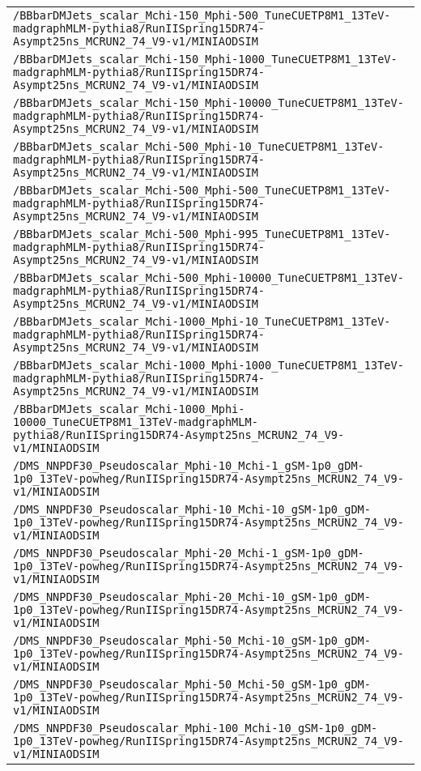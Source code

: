 \begin{center}
\begin{tabular}{l}
\verb!/BBbarDMJets_scalar_Mchi-150_Mphi-500_TuneCUETP8M1_13TeV-madgraphMLM-pythia8/RunIISpring15DR74-Asympt25ns_MCRUN2_74_V9-v1/MINIAODSIM! \tabularnewline
\verb!/BBbarDMJets_scalar_Mchi-150_Mphi-1000_TuneCUETP8M1_13TeV-madgraphMLM-pythia8/RunIISpring15DR74-Asympt25ns_MCRUN2_74_V9-v1/MINIAODSIM! \tabularnewline
\verb!/BBbarDMJets_scalar_Mchi-150_Mphi-10000_TuneCUETP8M1_13TeV-madgraphMLM-pythia8/RunIISpring15DR74-Asympt25ns_MCRUN2_74_V9-v1/MINIAODSIM! \tabularnewline
\verb!/BBbarDMJets_scalar_Mchi-500_Mphi-10_TuneCUETP8M1_13TeV-madgraphMLM-pythia8/RunIISpring15DR74-Asympt25ns_MCRUN2_74_V9-v1/MINIAODSIM! \tabularnewline
\verb!/BBbarDMJets_scalar_Mchi-500_Mphi-500_TuneCUETP8M1_13TeV-madgraphMLM-pythia8/RunIISpring15DR74-Asympt25ns_MCRUN2_74_V9-v1/MINIAODSIM! \tabularnewline
\verb!/BBbarDMJets_scalar_Mchi-500_Mphi-995_TuneCUETP8M1_13TeV-madgraphMLM-pythia8/RunIISpring15DR74-Asympt25ns_MCRUN2_74_V9-v1/MINIAODSIM! \tabularnewline
\verb!/BBbarDMJets_scalar_Mchi-500_Mphi-10000_TuneCUETP8M1_13TeV-madgraphMLM-pythia8/RunIISpring15DR74-Asympt25ns_MCRUN2_74_V9-v1/MINIAODSIM! \tabularnewline
\verb!/BBbarDMJets_scalar_Mchi-1000_Mphi-10_TuneCUETP8M1_13TeV-madgraphMLM-pythia8/RunIISpring15DR74-Asympt25ns_MCRUN2_74_V9-v1/MINIAODSIM! \tabularnewline
\verb!/BBbarDMJets_scalar_Mchi-1000_Mphi-1000_TuneCUETP8M1_13TeV-madgraphMLM-pythia8/RunIISpring15DR74-Asympt25ns_MCRUN2_74_V9-v1/MINIAODSIM! \tabularnewline
\verb!/BBbarDMJets_scalar_Mchi-1000_Mphi-10000_TuneCUETP8M1_13TeV-madgraphMLM-pythia8/RunIISpring15DR74-Asympt25ns_MCRUN2_74_V9-v1/MINIAODSIM! \tabularnewline
\verb!/DMS_NNPDF30_Pseudoscalar_Mphi-10_Mchi-1_gSM-1p0_gDM-1p0_13TeV-powheg/RunIISpring15DR74-Asympt25ns_MCRUN2_74_V9-v1/MINIAODSIM! \tabularnewline
\verb!/DMS_NNPDF30_Pseudoscalar_Mphi-10_Mchi-10_gSM-1p0_gDM-1p0_13TeV-powheg/RunIISpring15DR74-Asympt25ns_MCRUN2_74_V9-v1/MINIAODSIM! \tabularnewline
\verb!/DMS_NNPDF30_Pseudoscalar_Mphi-20_Mchi-1_gSM-1p0_gDM-1p0_13TeV-powheg/RunIISpring15DR74-Asympt25ns_MCRUN2_74_V9-v1/MINIAODSIM! \tabularnewline
\verb!/DMS_NNPDF30_Pseudoscalar_Mphi-20_Mchi-10_gSM-1p0_gDM-1p0_13TeV-powheg/RunIISpring15DR74-Asympt25ns_MCRUN2_74_V9-v1/MINIAODSIM! \tabularnewline
\verb!/DMS_NNPDF30_Pseudoscalar_Mphi-50_Mchi-10_gSM-1p0_gDM-1p0_13TeV-powheg/RunIISpring15DR74-Asympt25ns_MCRUN2_74_V9-v1/MINIAODSIM! \tabularnewline
\verb!/DMS_NNPDF30_Pseudoscalar_Mphi-50_Mchi-50_gSM-1p0_gDM-1p0_13TeV-powheg/RunIISpring15DR74-Asympt25ns_MCRUN2_74_V9-v1/MINIAODSIM! \tabularnewline
\verb!/DMS_NNPDF30_Pseudoscalar_Mphi-100_Mchi-10_gSM-1p0_gDM-1p0_13TeV-powheg/RunIISpring15DR74-Asympt25ns_MCRUN2_74_V9-v1/MINIAODSIM! \tabularnewline

\end{tabular}
\end{center}
